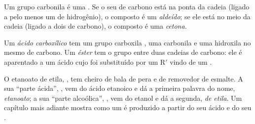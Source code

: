 \begin{definition}\label{def:g11:functional-groups:carbonyl}
Um grupo carbonila é uma  . Se o seu  de
carbono está na ponta da cadeia (ligado a pelo menos um  de
hidrogênio), o composto é um \emph{aldeído}; se ele está
no meio da cadeia (ligado a dois  de carbono), o composto é uma
\emph{cetona}.
\end{definition}

\begin{definition}\label{def:g11:functional-groups:carboxylic-acid}
Um \emph{ácido carboxílico} tem um grupo
carboxila , uma carbonila e uma hidroxila no mesmo  de
carbono. Um \emph{éster} tem o grupo  entre duas
cadeias de carbono: ele é aparentado a um ácido cujo  foi
substituído por um R$'$ vindo de um .
\end{definition}

\begin{example}\label{ex:g11:functional-groups:ethyl-ethanoate}
O  etanoato de etila, , tem cheiro de bala
de pera e de removedor de esmalte. A sua ``parte ácida'', ,
vem do ácido etanoico  e dá a primeira palavra do nome,
\emph{etanoato}; a sua ``parte alcoólica'', , vem do
etanol  e dá a segunda, \emph{de etila}. Um capítulo mais
adiante mostra como um  é produzido a partir do seu ácido e do seu
.
\end{example}

